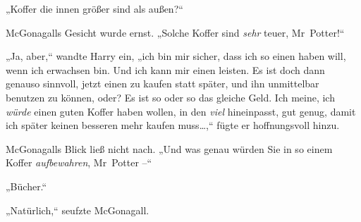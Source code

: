 „Koffer die innen größer sind als außen?“

McGonagalls Gesicht wurde ernst. „Solche Koffer sind \emph{sehr} teuer, Mr~Potter!“

„Ja, aber,“ wandte Harry ein, „ich bin mir sicher, dass ich so einen haben will, wenn ich erwachsen bin. Und ich kann mir einen leisten. Es ist doch dann genauso sinnvoll, jetzt einen zu kaufen statt später, und ihn unmittelbar benutzen zu können, oder? Es ist so oder so das gleiche Geld. Ich meine, ich \emph{würde} einen guten Koffer haben wollen, in den \emph{viel} hineinpasst, gut genug, damit ich später keinen besseren mehr kaufen muss…,“ fügte er hoffnungsvoll hinzu.

McGonagalls Blick ließ nicht nach. „Und was genau würden Sie in so einem Koffer \emph{aufbewahren}, Mr~Potter –“

„Bücher.“

„Natürlich,“ seufzte McGonagall.

